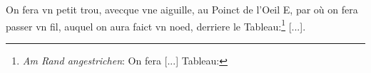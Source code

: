 \pend \pstart [p.~99] On fera vn petit trou, avecque vne aiguille, au Poinct de l'Oeil E, par o\`{u} on fera passer vn fil, auquel on aura faict vn noed, derriere le Tableau:\footnote{\textit{Am Rand angestrichen}: On fera [...] Tableau:} [...].